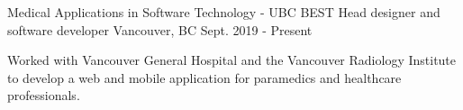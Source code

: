 \documentclass[]{awesome-cv}
\begin{document}
\cventry
  {Medical Applications in Software Technology - UBC BEST}
  {Head designer and software developer}
  {Vancouver, BC}
  {Sept. 2019 - Present}
  {\begin{cvitems}
      \item {Worked with Vancouver General Hospital and the Vancouver Radiology Institute to develop a web and mobile application for paramedics and healthcare professionals.}
  \end{cvitems}}
\end{document}
